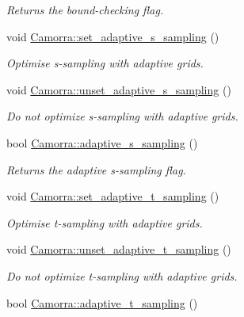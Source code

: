 \begin{DoxyCompactItemize}
\begin{DoxyCompactList}\small\item\em Returns the bound-\/checking flag. \end{DoxyCompactList}\item 
\hypertarget{a00829_aa23e6050bd813300a6cc4e68301a680b}{
void \hyperlink{a00829_aa23e6050bd813300a6cc4e68301a680b}{Camorra::set\_\-adaptive\_\-s\_\-sampling} ()}
\label{a00829_aa23e6050bd813300a6cc4e68301a680b}

\begin{DoxyCompactList}\small\item\em Optimise s-\/sampling with adaptive grids. \end{DoxyCompactList}\item 
\hypertarget{a00829_ab65c79fa174745c806ef38cbec2ee367}{
void \hyperlink{a00829_ab65c79fa174745c806ef38cbec2ee367}{Camorra::unset\_\-adaptive\_\-s\_\-sampling} ()}
\label{a00829_ab65c79fa174745c806ef38cbec2ee367}

\begin{DoxyCompactList}\small\item\em Do not optimize s-\/sampling with adaptive grids. \end{DoxyCompactList}\item 
\hypertarget{a00829_a54293db384f71be66101216d13cd5b13}{
bool \hyperlink{a00829_a54293db384f71be66101216d13cd5b13}{Camorra::adaptive\_\-s\_\-sampling} ()}
\label{a00829_a54293db384f71be66101216d13cd5b13}

\begin{DoxyCompactList}\small\item\em Returns the adaptive s-\/sampling flag. \end{DoxyCompactList}\item 
\hypertarget{a00829_aecfbb69e43431f561d3d38834e153c0b}{
void \hyperlink{a00829_aecfbb69e43431f561d3d38834e153c0b}{Camorra::set\_\-adaptive\_\-t\_\-sampling} ()}
\label{a00829_aecfbb69e43431f561d3d38834e153c0b}

\begin{DoxyCompactList}\small\item\em Optimise t-\/sampling with adaptive grids. \end{DoxyCompactList}\item 
\hypertarget{a00829_ad0d9c41614a0b23e3f413cca183b7541}{
void \hyperlink{a00829_ad0d9c41614a0b23e3f413cca183b7541}{Camorra::unset\_\-adaptive\_\-t\_\-sampling} ()}
\label{a00829_ad0d9c41614a0b23e3f413cca183b7541}

\begin{DoxyCompactList}\small\item\em Do not optimize t-\/sampling with adaptive grids. \end{DoxyCompactList}\item 
\hypertarget{a00829_a249c2403f0350fffedf4785f6348924e}{
bool \hyperlink{a00829_a249c2403f0350fffedf4785f6348924e}{Camorra::adaptive\_\-t\_\-sampling} ()}
\label{a00829_a249c2403f0350fffedf4785f6348924e}


\end{DoxyCompactItemize}
